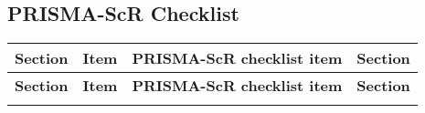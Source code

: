 
\subsection{PRISMA-ScR Checklist}\label{checklist}

\begin{longtable}{p{3cm} p{1cm} p{6cm} p{1.5cm}}
\toprule
\textbf{Section} & \textbf{Item} & \textbf{PRISMA-ScR checklist item} & \textbf{Section} \\
\midrule
\endfirsthead

\toprule
\textbf{Section} & \textbf{Item} & \textbf{PRISMA-ScR checklist item} & \textbf{Section} \\
\midrule
\endhead

\endfoot


\end{longtable}
